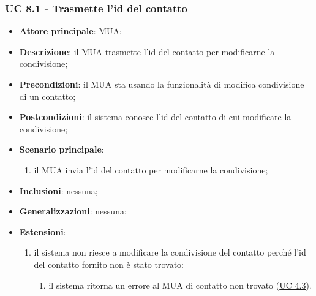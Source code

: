     \subsubsection{UC 8.1 - Trasmette l'id del contatto} \label{sec:UC8.1}
    \begin{itemize}
        \item \textbf{Attore principale}: MUA;
        \item \textbf{Descrizione}: il MUA trasmette l'id del contatto per modificarne la condivisione;
        \item \textbf{Precondizioni}: il MUA sta usando la funzionalità di modifica condivisione di un contatto;
        \item \textbf{Postcondizioni}: il sistema conosce l'id del contatto di cui modificare la condivisione;
        \item \textbf{Scenario principale}:
            \begin{enumerate}
                \item il MUA invia l'id del contatto per modificarne la condivisione;
            \end{enumerate}
        \item \textbf{Inclusioni}: nessuna;
        \item \textbf{Generalizzazioni}: nessuna;
        \item \textbf{Estensioni}:
            \begin{enumerate}[label=\alph*.]
                \item il sistema non riesce a modificare la condivisione del contatto perché l'id del contatto fornito non è stato trovato:
                \begin{enumerate}[label=\arabic*.]
                    \item il sistema ritorna un errore al MUA di contatto non trovato (\hyperref[sec:UC4.3]{UC 4.3}).
                \end{enumerate}
            \end{enumerate}
    \end{itemize}


